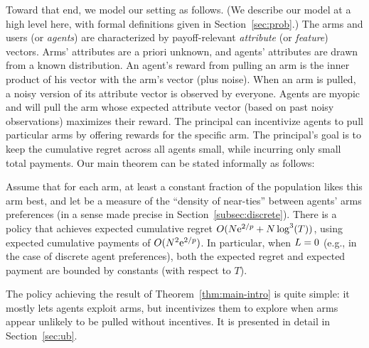 Toward that end, we model our setting as follows.
(We describe our model at a high level here,
with formal definitions given in Section~\ref{sec:prob}.)
The \ARMNUM arms and users (or \emph{agents})
are characterized by payoff-relevant
\emph{attribute} (or \emph{feature}) vectors.
Arms' attributes are a priori unknown,
and agents' attributes are drawn from a known distribution.
An agent's reward from pulling an arm is the inner product of his
vector with the arm's vector (plus noise).
When an arm is pulled, a noisy version of its attribute vector is
observed by everyone.
Agents are myopic and will pull the arm whose expected attribute
vector (based on past noisy observations) maximizes their reward.
The principal can incentivize agents to pull particular arms by
offering rewards for the specific arm.
The principal's goal is to keep the cumulative regret across all
agents small, while incurring only small total payments.
Our main theorem can be stated informally as follows:

\begin{theorem} \label{thm:main-intro}
Assume that for each arm, at least a constant fraction \MinProb
of the population likes this arm best,
and let \TieDensity be a measure of the ``density of near-ties''
between agents' arms preferences
(in a sense made precise in Section~\ref{subsec:discrete}).
There is a policy that achieves expected 
cumulative regret $O (N \mathrm{e}^{2/p} + N \log^3(T))$,
using expected cumulative payments of $O(N^2 \mathrm{e}^{2/p})$.
In particular, when $L = 0$
(e.g., in the case of discrete agent preferences),
both the expected regret and expected payment are bounded by constants
(with respect to $T$). 
\end{theorem}

The policy achieving the result of Theorem~\ref{thm:main-intro} is
quite simple: it mostly lets agents exploit arms, but incentivizes
them to explore when arms appear unlikely to be pulled without incentives.
It is presented in detail in Section~\ref{sec:ub}.
